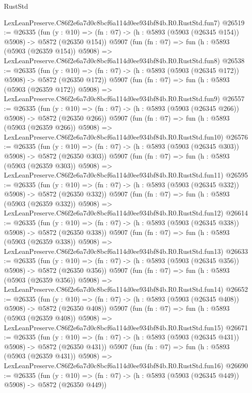 \begin{lexlean}{RustStd}
\begin{coremodule}
    LexLeanPreserve.C86f2e6a7d0c8bcf6a114d0ee934bf84b.R0.RustStd.fun7)
@26519 := @26335
    (fun (y : @10) => (fn : @7) -> (h : @5893 (@5903 (@26345 @154)) @5908) -> @5872 (@26350 @154))
    @5907
    (fun (fn : @7) =>
    fun (h : @5893 (@5903 (@26359 @154)) @5908) =>
    LexLeanPreserve.C86f2e6a7d0c8bcf6a114d0ee934bf84b.R0.RustStd.fun8)
@26538 := @26335
    (fun (y : @10) => (fn : @7) -> (h : @5893 (@5903 (@26345 @172)) @5908) -> @5872 (@26350 @172))
    @5907
    (fun (fn : @7) =>
    fun (h : @5893 (@5903 (@26359 @172)) @5908) =>
    LexLeanPreserve.C86f2e6a7d0c8bcf6a114d0ee934bf84b.R0.RustStd.fun9)
@26557 := @26335
    (fun (y : @10) => (fn : @7) -> (h : @5893 (@5903 (@26345 @266)) @5908) -> @5872 (@26350 @266))
    @5907
    (fun (fn : @7) =>
    fun (h : @5893 (@5903 (@26359 @266)) @5908) =>
    LexLeanPreserve.C86f2e6a7d0c8bcf6a114d0ee934bf84b.R0.RustStd.fun10)
@26576 := @26335
    (fun (y : @10) => (fn : @7) -> (h : @5893 (@5903 (@26345 @303)) @5908) -> @5872 (@26350 @303))
    @5907
    (fun (fn : @7) =>
    fun (h : @5893 (@5903 (@26359 @303)) @5908) =>
    LexLeanPreserve.C86f2e6a7d0c8bcf6a114d0ee934bf84b.R0.RustStd.fun11)
@26595 := @26335
    (fun (y : @10) => (fn : @7) -> (h : @5893 (@5903 (@26345 @332)) @5908) -> @5872 (@26350 @332))
    @5907
    (fun (fn : @7) =>
    fun (h : @5893 (@5903 (@26359 @332)) @5908) =>
    LexLeanPreserve.C86f2e6a7d0c8bcf6a114d0ee934bf84b.R0.RustStd.fun12)
@26614 := @26335
    (fun (y : @10) => (fn : @7) -> (h : @5893 (@5903 (@26345 @338)) @5908) -> @5872 (@26350 @338))
    @5907
    (fun (fn : @7) =>
    fun (h : @5893 (@5903 (@26359 @338)) @5908) =>
    LexLeanPreserve.C86f2e6a7d0c8bcf6a114d0ee934bf84b.R0.RustStd.fun13)
@26633 := @26335
    (fun (y : @10) => (fn : @7) -> (h : @5893 (@5903 (@26345 @356)) @5908) -> @5872 (@26350 @356))
    @5907
    (fun (fn : @7) =>
    fun (h : @5893 (@5903 (@26359 @356)) @5908) =>
    LexLeanPreserve.C86f2e6a7d0c8bcf6a114d0ee934bf84b.R0.RustStd.fun14)
@26652 := @26335
    (fun (y : @10) => (fn : @7) -> (h : @5893 (@5903 (@26345 @408)) @5908) -> @5872 (@26350 @408))
    @5907
    (fun (fn : @7) =>
    fun (h : @5893 (@5903 (@26359 @408)) @5908) =>
    LexLeanPreserve.C86f2e6a7d0c8bcf6a114d0ee934bf84b.R0.RustStd.fun15)
@26671 := @26335
    (fun (y : @10) => (fn : @7) -> (h : @5893 (@5903 (@26345 @431)) @5908) -> @5872 (@26350 @431))
    @5907
    (fun (fn : @7) =>
    fun (h : @5893 (@5903 (@26359 @431)) @5908) =>
    LexLeanPreserve.C86f2e6a7d0c8bcf6a114d0ee934bf84b.R0.RustStd.fun16)
@26690 := @26335
    (fun (y : @10) => (fn : @7) -> (h : @5893 (@5903 (@26345 @449)) @5908) -> @5872 (@26350 @449))

\end{coremodule}
\end{lexlean}
